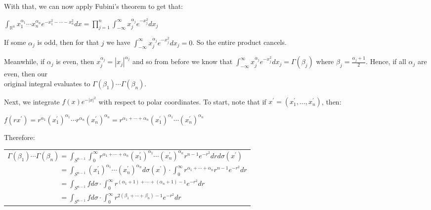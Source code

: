 \documentclass{book}
\newenvironment{myIndent}{%
   \begin{adjustwidth}{2.5em}{0em}%
}{%
   \end{adjustwidth}%
}
\newcommand{\retTwo}{\hfill\bigbreak}
\begin{document}
\begin{myIndent}
	With that, we can now apply Fubini's theorem to get that:

	{\centering $\int_{\mathbb{R}^n} x_1^{\alpha_1}\cdots x_n^{\alpha_n}e^{-x_1^2 - \cdots - x_n^2}dx = \prod\limits_{j=1}^n \int_{-\infty}^\infty x_j^{\alpha_j}e^{-x_j^2}dx_j$ \retTwo\par}

	If some $\alpha_j$ is odd, then for that $j$ we have $\int_{-\infty}^\infty x_j^{\alpha_j}e^{-x_j^2}dx_j = 0$. So the entire product cancels.\retTwo

	Meanwhile, if $\alpha_j$ is even, then $x_j^{\alpha_j} = |x_j|^{\alpha_j}$ and so from before we know that $\int_{-\infty}^\infty x_j^{\alpha_j}e^{-x_j^2}dx_j = \Gamma(\beta_j)$ where $\beta_j = \frac{\alpha_j + 1}{2}$. Hence, if all $\alpha_j$ are even, then our\\ [2pt] original integral evaluates to $\Gamma(\beta_1)\cdots\Gamma(\beta_n)$.\retTwo
	
	Next, we integrate $f(x)e^{-|x|^2}$ with respect to polar coordinates. To start, note that if $x^\prime = (x^\prime_1, \ldots, x^\prime_n)$, then:

	{\centering $f(rx^\prime) = r^{\alpha_1}(x^\prime_1)^{\alpha_1}\cdots r^{\alpha_n}(x^\prime_n)^{\alpha_n} = r^{\alpha_1 + \cdots + \alpha_n}(x^\prime_1)^{\alpha_1}\cdots (x^\prime_n)^{\alpha_n}$ \retTwo\par}

	Therefore: 
	
	{\centering 
	\begin{tabular}{l}
		$\Gamma(\beta_1)\cdots\Gamma(\beta_n) = \int_{S^{n-1}} \int_0^\infty r^{\alpha_1 + \cdots + \alpha_n}(x^\prime_1)^{\alpha_1}\cdots (x^\prime_n)^{\alpha_n} r^{n-1} e^{-r^2}drd\sigma(x^\prime)$\\ [6pt]

		$\phantom{\Gamma(\beta_1)\cdots\Gamma(\beta_n)} = \int_{S^{n-1}} (x^\prime_1)^{\alpha_1}\cdots (x^\prime_n)^{\alpha_n} d\sigma(x^\prime) \cdot \int_0^\infty r^{\alpha_1 + \cdots + \alpha_n} r^{n-1} e^{-r^2}dr$\\ [6pt]

		$\phantom{\Gamma(\beta_1)\cdots\Gamma(\beta_n)} = \int_{S^{n-1}} f d\sigma \cdot \int_0^\infty r^{(\alpha_1 + 1) + \cdots + (\alpha_n + 1) - 1} e^{-r^2}dr$\\ [6pt]

		$\phantom{\Gamma(\beta_1)\cdots\Gamma(\beta_n)} = \int_{S^{n-1}} f d\sigma \cdot \int_0^\infty r^{2(\beta_1 + \cdots + \beta_n) - 1} e^{-r^2}dr$\\ [6pt]


\end{tabular}}
\end{myIndent}
\end{document}
